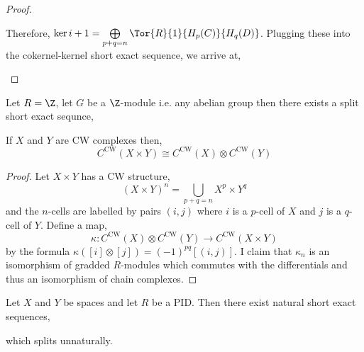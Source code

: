 \documentclass[12pt]{extarticle}
\begin{document}
\begin{proof}
\begin{center}
\begin{tikzcd}[column sep = small]
\end{tikzcd}
\end{center} 
Therefore, $\ker{i+1} = \bigoplus\limits_{p+q = n} \Tor{R}{1}{H_p(C)}{H_q(D)}$. 
Plugging these into the cokernel-kernel short exact sequence, we arrive at,
\begin{center}
\end{center}

\end{proof}

\begin{corollary}
Let $R = \Z$, let $G$ be a $\Z$-module i.e. any abelian group then there exists a split short exact sequnce,
\begin{center}
\end{center}
\end{corollary}

\begin{proposition}
If $X$ and $Y$ are CW complexes then, 
\[C^{\text{CW}}(X \times Y) \cong C^{\text{CW}}(X) \otimes C^{\text{CW}}(Y)\]  
\end{proposition}

\begin{proof}
Let $X \times Y$ has a CW structure,
\[(X \times Y)^n = \bigcup_{p + q = n} X^p \times Y^q \]
and the $n$-cells are labelled by pairs $(i, j)$ where $i$ is a $p$-cell of $X$ and $j$ is a $q$-cell of $Y$. Define a map, 
\[\kappa : C^{\text{CW}}(X) \otimes C^{\text{CW}}(Y) \to C^{\text{CW}}(X \times Y) \]
by the formula $\kappa([i] \otimes [j]) = (-1)^{pq} [(i,j)]$. I claim that $\kappa_n$ is an isomorphism of gradded $R$-modules which commutes with the differentials and thus an isomorphism of chain complexes.  
\end{proof}

\begin{theorem}[K\"{u}nneth]
Let $X$ and $Y$ be spaces and let $R$ be a PID. Then there exist natural short exact sequences,
\begin{center}
\end{center}
which splits unnaturally. 
\end{theorem}
\end{document}
